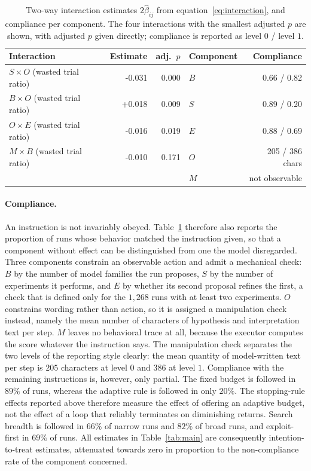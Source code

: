 \documentclass[11pt]{article}
\begin{document}
\begin{table}[t]
\centering
\small
\caption{Two-way interaction estimates $2\hat\beta_{ij}$ from equation~\eqref{eq:interaction}, and compliance per component. The four interactions with the smallest adjusted $p$ are
shown, with adjusted $p$ given directly; compliance is reported as level $0$ / level $1$.}
\label{tab:interactions}
\begin{tabular}{lrr@{\hskip 1.2cm}lr}
\toprule
Interaction & Estimate & adj.\ $p$ & Component & Compliance \\
\midrule
$S \times O$ (wasted trial ratio) & -0.031 & 0.000 & $B$ & 0.66 / 0.82 \\
$B \times O$ (wasted trial ratio) & +0.018 & 0.009 & $S$ & 0.89 / 0.20 \\
$O \times E$ (wasted trial ratio) & -0.016 & 0.019 & $E$ & 0.88 / 0.69 \\
$M \times B$ (wasted trial ratio) & -0.010 & 0.171 & $O$ & 205 / 386 chars \\
 &  &  & $M$ & not observable \\
\bottomrule
\end{tabular}
\end{table}

\paragraph{Compliance.} An instruction is not invariably obeyed. Table~\ref{tab:interactions} therefore also reports the proportion of runs whose behavior matched the instruction given, so that a component without effect can be distinguished from one the model disregarded. Three components constrain an observable action and admit a mechanical check: $B$ by the number of model families the run proposes, $S$ by the number of experiments it performs, and $E$ by whether its second proposal refines the first, a check that is defined only for the $1{,}268$ runs with at least two experiments. $O$ constrains wording rather than action, so it is assigned a manipulation check instead, namely the mean number of characters of hypothesis and interpretation text per step. $M$ leaves no behavioral trace at all, because the executor computes the score whatever the instruction says. The manipulation check separates the two levels of the reporting style clearly: the mean quantity of model-written text per step is $205$ characters at level $0$ and $386$ at level $1$. Compliance with the remaining instructions is, however, only partial. The fixed budget is followed in $89\%$ of runs, whereas the adaptive rule is followed in only $20\%$. The stopping-rule effects reported above therefore measure the effect of offering an adaptive budget, not the effect of a loop that reliably terminates on diminishing returns. Search breadth is followed in $66\%$ of narrow runs and $82\%$ of broad runs, and exploit-first in $69\%$ of runs. All estimates in Table~\ref{tab:main} are consequently intention-to-treat estimates, attenuated towards zero in proportion to the non-compliance rate of the component concerned.
\end{document}

